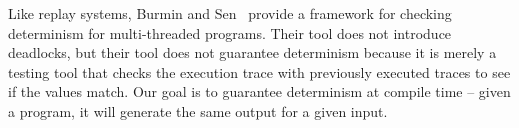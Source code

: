 Like replay systems, Burmin and Sen~\cite{Burnim2009asserting} provide a framework for
checking determinism for multi-threaded programs. Their tool does not
introduce deadlocks, but their tool does not guarantee determinism
because it is merely a testing tool that checks the execution trace
with previously executed traces to see if the values match. Our
goal is to guarantee determinism at compile time -- given a program,
it will generate the same output for a given input.





